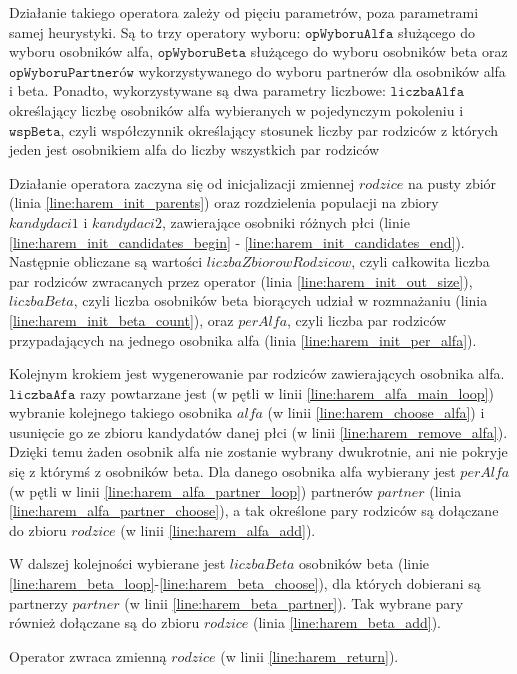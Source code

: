 \documentclass[twoside]{iisthesis}
\newcommand{\param}[1]{\mathtt{#1}}
\begin{document}
Działanie takiego operatora zależy od pięciu parametrów, poza parametrami samej heurystyki.
Są to trzy operatory wyboru: $\param{opWyboruAlfa}$ służącego do wyboru osobników alfa, $\param{opWyboruBeta}$ służącego do wyboru osobników beta oraz $\param{opWyboruPartnerów}$ wykorzystywanego do wyboru partnerów dla osobników alfa i beta.
Ponadto, wykorzystywane są dwa parametry liczbowe: $\param{liczbaAlfa}$ określający liczbę osobników alfa wybieranych w pojedynczym pokoleniu i $\param{wspBeta}$, czyli współczynnik określający stosunek liczby par rodziców z których jeden jest osobnikiem alfa do liczby wszystkich par rodziców 

Działanie operatora zaczyna się od inicjalizacji zmiennej $rodzice$ na pusty zbiór (linia \ref{line:harem_init_parents}) oraz rozdzielenia populacji na zbiory $kandydaci1$ i $kandydaci2$, zawierające osobniki różnych płci (linie \ref{line:harem_init_candidates_begin} - \ref{line:harem_init_candidates_end}).
Następnie obliczane są wartości $liczbaZbiorowRodzicow$, czyli całkowita liczba par rodziców zwracanych przez operator  (linia \ref{line:harem_init_out_size}), $liczbaBeta$, czyli liczba osobników beta biorących udział w rozmnażaniu  (linia \ref{line:harem_init_beta_count}), oraz $perAlfa$, czyli liczba par rodziców przypadających na jednego osobnika alfa (linia \ref{line:harem_init_per_alfa}).

Kolejnym krokiem jest wygenerowanie par rodziców zawierających osobnika alfa.
$\param{liczbaAfa}$ razy powtarzane jest (w pętli w linii \ref{line:harem_alfa_main_loop}) wybranie kolejnego takiego osobnika $alfa$ (w linii \ref{line:harem_choose_alfa}) i usunięcie go ze zbioru kandydatów danej płci (w linii \ref{line:harem_remove_alfa}).
Dzięki temu żaden osobnik alfa nie zostanie wybrany dwukrotnie, ani nie pokryje się z którymś z osobników beta.
Dla danego osobnika alfa wybierany jest $perAlfa$ (w pętli w linii \ref{line:harem_alfa_partner_loop}) partnerów $partner$ (linia \ref{line:harem_alfa_partner_choose}), a tak określone pary rodziców są dołączane do zbioru $rodzice$ (w linii \ref{line:harem_alfa_add}).

W dalszej kolejności wybierane jest $liczbaBeta$ osobników beta (linie \ref{line:harem_beta_loop}-\ref{line:harem_beta_choose}), dla których dobierani są partnerzy $partner$ (w linii \ref{line:harem_beta_partner}). Tak wybrane pary również dołączane są do zbioru $rodzice$ (linia \ref{line:harem_beta_add}).

Operator zwraca zmienną $rodzice$ (w linii \ref{line:harem_return}).
\end{document}
